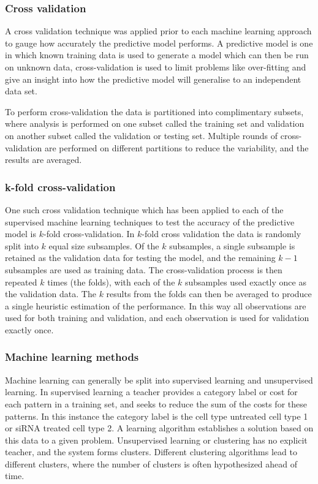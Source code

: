 \subsubsection{Cross validation}
A cross validation technique was applied prior to each machine learning approach to gauge how accurately the predictive model performs. A predictive model is one in which known training data is used to generate a model which can then be run on unknown data, cross-validation is used to limit problems like over-fitting and give an insight into how the predictive model will generalise to an independent data set. 

To perform cross-validation the data is partitioned into complimentary subsets, where analysis is performed on one subset called the training set  and validation on another subset called the validation or testing set. Multiple rounds of cross-validation are performed on different partitions to reduce the variability, and the results are averaged.

\subsubsection{k-fold cross-validation}
One such cross validation technique which has been applied to each of the supervised machine learning techniques to test the accuracy of the predictive model is $k$-fold cross-validation. In $k$-fold cross validation the data is randomly split into $k$ equal size subsamples. Of the $k$ subsamples, a single subsample is retained as the validation data for testing the model, and the remaining $k - 1$ subsamples are used as training data. The cross-validation process is then repeated $k$ times (the folds), with each of the $k$ subsamples used exactly once as the validation data. The $k$ results from the folds can then be averaged to produce a single heuristic estimation of the performance. In this way all observations are used for both training and validation, and each observation is used for validation exactly once.

\subsubsection{Machine learning methods}
Machine learning can generally be split into supervised learning and unsupervised learning. In supervised learning a teacher provides a category label or cost for each pattern in a training set, and seeks to reduce the sum of the costs for these patterns. In this instance the category label is the cell type untreated cell type 1 or siRNA treated cell type 2. A learning algorithm establishes a solution based on this data to a given problem. Unsupervised learning or clustering has no explicit teacher, and the system forms clusters. Different clustering algorithms lead to different clusters, where the number of clusters is often hypothesized ahead of time.

